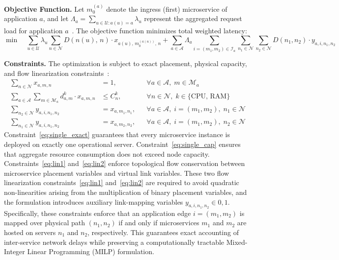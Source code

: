\documentclass[ASNA]{USG} %
\begin{document}
\textbf{Objective Function.} Let $m_0^{(a)}$ denote the ingress (first) microservice of application $a$, and let $\Lambda_a = \sum_{u \in \mathcal{U}: a(u)=a} \lambda_u$ represent the aggregated request load for application $a$~\cite{Soumplis2024Performance}. The objective function minimizes total weighted latency:
\begin{equation}
\min \quad \sum_{u \in \mathcal{U}} \lambda_u \sum_{n \in \mathcal{N}} D(n(u), \, n) \cdot x_{a(u), \, m_0^{(a(u))}, \, n}
+ \sum_{a \in \mathcal{A}} \Lambda_a \sum_{i=(m_1,m_2) \in \mathcal{I}_a} \sum_{n_1 \in \mathcal{N}} \sum_{n_2 \in \mathcal{N}} D(n_1, n_2) \cdot y_{a,i,n_1,n_2}
\end{equation}

\textbf{Constraints.} The optimization is subject to exact placement, physical capacity, and flow linearization constraints~\cite{Taghavian2023An}:
\begin{align}
\sum_{n \in \mathcal{N}} x_{a,m,n} &= 1, && \forall a \in \mathcal{A}, \; m \in \mathcal{M}_a \label{eq:single_exact} \\
\sum_{a \in \mathcal{A}} \sum_{m \in \mathcal{M}_a} d_{a,m}^k \cdot x_{a,m,n} &\leq C_n^k, && \forall n \in \mathcal{N}, \; k \in \{\text{CPU, RAM}\} \label{eq:single_cap} \\
\sum_{n_2 \in \mathcal{N}} y_{a,i,n_1,n_2} &= x_{a,m_1,n_1}, && \forall a \in \mathcal{A}, \; i=(m_1,m_2), \; n_1 \in \mathcal{N} \label{eq:lin1} \\
\sum_{n_1 \in \mathcal{N}} y_{a,i,n_1,n_2} &= x_{a,m_2,n_2}, && \forall a \in \mathcal{A}, \; i=(m_1,m_2), \; n_2 \in \mathcal{N} \label{eq:lin2}
\end{align}
Constraint~\eqref{eq:single_exact} guarantees that every microservice instance is deployed on exactly one operational server. Constraint~\eqref{eq:single_cap} ensures that aggregate resource consumption does not exceed node capacity. Constraints~\eqref{eq:lin1} and~\eqref{eq:lin2} enforce topological flow conservation between microservice placement variables and virtual link variables. These two flow linearization constraints~\eqref{eq:lin1} and~\eqref{eq:lin2} are required to avoid quadratic non-linearities arising from the multiplication of binary placement variables, and the formulation introduces auxiliary link-mapping variables $y_{a,i,n_1,n_2} \in {0,1}$. Specifically, these constraints  enforce that an application edge $i=(m_1,m_2)$ is mapped over physical path $(n_1,n_2)$ if and only if microservices $m_1$ and $m_2$ are hosted on servers $n_1$ and $n_2$, respectively. This guarantees exact accounting of inter-service network delays while preserving a computationally tractable Mixed-Integer Linear Programming (MILP) formulation.
\end{document}
